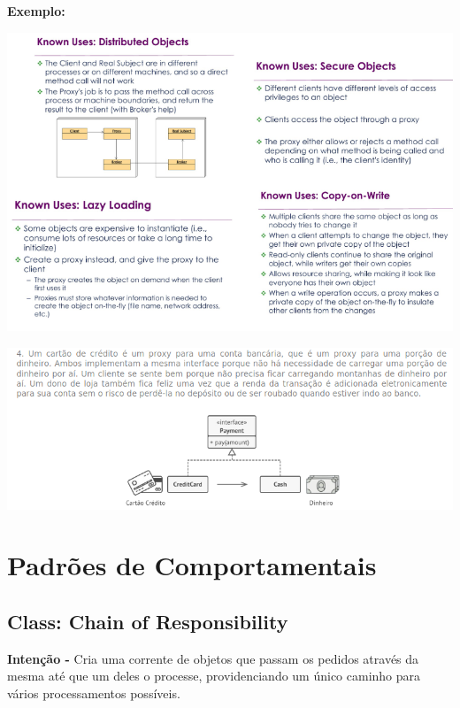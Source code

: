 \documentclass{article}
\begin{document}
\begin{flushleft}
    \textbf{Exemplo:}

    \begin{center}
        \includegraphics[scale=0.5]{Images/56.png}
    \end{center}

    \vspace{4mm}
    \begin{center}
        \includegraphics[scale=0.5]{Images/57.png}
    \end{center}
\end{flushleft}


\pagebreak

\section{Padrões de Comportamentais}

\subsection{Class: Chain of Responsibility}

\begin{flushleft}
    \textbf{Intenção -} Cria uma corrente de objetos que passam os pedidos através da mesma até que um deles o processe,
providenciando um único caminho para vários processamentos possíveis.
\end{flushleft}
\end{document}
